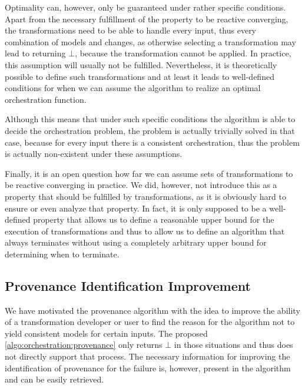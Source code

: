 Optimality can, however, only be guaranteed under rather specific conditions.
Apart from the necessary fulfillment of the property to be reactive converging, the transformations need to be able to handle every input, thus every combination of models and changes, as otherwise selecting a transformation may lead to  returning $\bot$, because the transformation cannot be applied.
In practice, this assumption will usually not be fulfilled.
Nevertheless, it is theoretically possible to define such transformations and at least it leads to well-defined conditions for when we can assume the algorithm to realize an optimal orchestration function.

Although this means that under such specific conditions the algorithm is able to decide the orchestration problem, the problem is actually trivially solved in that case, because for every input there is a consistent orchestration, thus the problem is actually non-existent under these assumptions.

Finally, it is an open question how far we can assume sets of transformations to be reactive converging in practice.
We did, however, not introduce this as a property that should be fulfilled by transformations, as it is obviously hard to ensure or even analyze that property.
In fact, it is only supposed to be a well-defined property that allows us to define a reasonable upper bound for the execution of transformations and thus to allow us to define an algorithm that always terminates without using a completely arbitrary upper bound for determining when to terminate.


\subsection{Provenance Identification Improvement}

We have motivated the provenance algorithm with the idea to improve the ability of a transformation developer or user to find the reason for the algorithm not to yield consistent models for certain inputs.
The proposed \autoref{algo:orchestration:provenance} only returns $\bot$ in those situations and thus does not directly support that process.
The necessary information for improving the identification of provenance for the failure is, however, present in the algorithm and can be easily retrieved.

